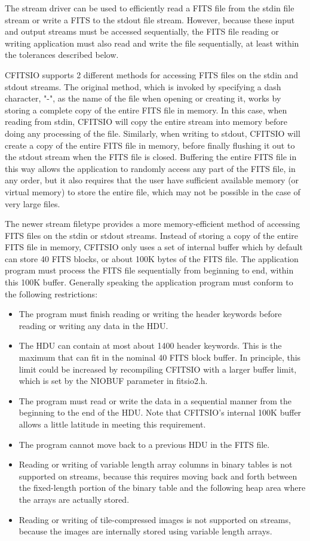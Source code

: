 \documentclass[11pt]{book}
\begin{document}
The stream driver can be used to efficiently read a FITS file from the stdin
file stream or write a FITS to the stdout file stream.  However, because these
input and output streams must be accessed sequentially, the FITS file reading or
writing application must also read and write the file sequentially, at least
within the tolerances described below.

CFITSIO supports 2 different methods for accessing FITS files on the stdin and
stdout streams.  The original method, which is invoked by specifying a dash
character, "-", as the name of the file when opening or creating it, works by
storing a complete copy of the entire FITS file in memory.  In this case, when
reading from stdin, CFITSIO will copy the entire stream into memory before doing
any processing of the file.  Similarly, when writing to stdout, CFITSIO will
create a copy of the entire FITS file in memory, before finally flushing it out
to  the stdout stream when the FITS file is closed.  Buffering the entire FITS
file in this way allows the application to randomly access any part of the FITS
file, in any order, but it also requires that the user have sufficient available
memory (or virtual memory) to store the entire file, which may not be possible
in the case of very large files.

The newer stream filetype provides a more memory-efficient method of accessing
FITS files on the stdin or stdout streams.  Instead of storing a copy of the
entire FITS file in memory, CFITSIO only uses a set of internal  buffer which by
default can store  40 FITS blocks, or about  100K bytes of the FITS file.  The
application program must process the FITS file sequentially from beginning to
end, within this 100K buffer.  Generally speaking the application  program must
conform to the following restrictions:

\begin{itemize}
\item
The program must finish reading or writing the header keywords
before reading or writing any data in the HDU.
\item
The HDU can contain at most about 1400 header keywords.  This is the
maximum that can fit in the nominal 40 FITS block buffer.  In principle,
this limit could be increased by recompiling CFITSIO with a larger
buffer limit, which is set by the NIOBUF parameter in fitsio2.h.
\item
The program must read or write the data in a sequential manner from the
beginning to the end of the HDU.  Note that CFITSIO's internal
100K buffer allows a little latitude in meeting this requirement.
\item
The program cannot move back to a previous HDU in the FITS file.
\item
Reading or writing of variable length array columns in binary tables is not
supported on streams, because this requires moving back and forth between the
fixed-length portion of the binary table and the following heap area where the
arrays are actually stored.
\item
Reading or writing of tile-compressed images is not supported on streams,
because the images are internally stored using variable length arrays.
\end{itemize}
\end{document}
